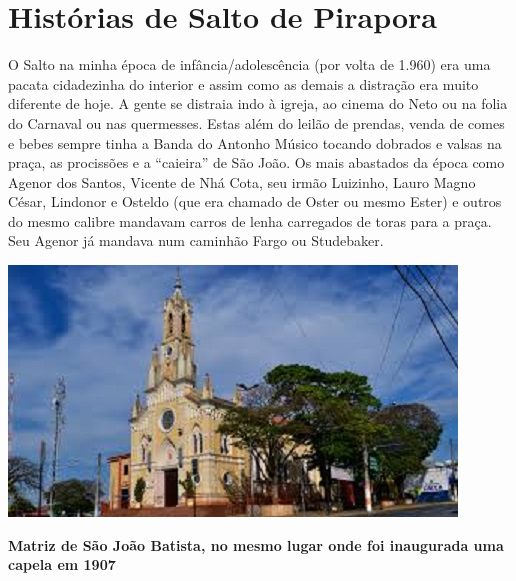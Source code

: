 \documentclass[12pt,brazil,]{book}
\begin{document}
\chapter{Histórias de Salto de
Pirapora}\label{histuxf3rias-de-salto-de-pirapora}

O Salto na minha época de infância/adolescência (por volta de 1.960) era
uma pacata cidadezinha do interior e assim como as demais a distração
era muito diferente de hoje. A gente se distraia indo à igreja, ao
cinema do Neto ou na folia do Carnaval ou nas quermesses. Estas além do
leilão de prendas, venda de comes e bebes sempre tinha a Banda do
Antonho Músico tocando dobrados e valsas na praça, as procissões e a
``caieira'' de São João. Os mais abastados da época como Agenor dos
Santos, Vicente de Nhá Cota, seu irmão Luizinho, Lauro Magno César,
Lindonor e Osteldo (que era chamado de Oster ou mesmo Ester) e outros do
mesmo calibre mandavam carros de lenha carregados de toras para a praça.
Seu Agenor já mandava num caminhão Fargo ou Studebaker.

\includegraphics{Imagens/Igreja.jpeg}

\textbf{Matriz de São João Batista, no mesmo lugar onde foi inaugurada
uma capela em 1907}
\end{document}
